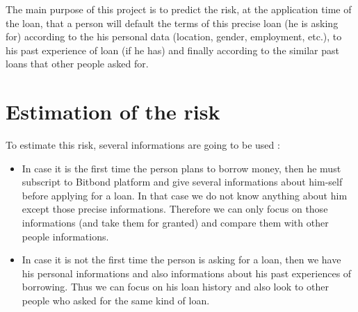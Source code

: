 The main purpose of this project is to predict the risk, at the application time of the loan, that a person will default the terms of this precise loan (he is asking for) according to the his personal data (location, gender, employment, etc.), to his past experience of loan (if he has) and finally according to the similar past loans that other people asked for.

\section{Estimation of the risk}
	To estimate this risk, several informations are going to be used :
	\begin{itemize}[label=$\bullet$]
	    \item In case it is the first time the person plans to borrow money, then he must subscript to Bitbond platform and give several informations about him-self before applying for a loan. In that case we do not know anything about him except those precise informations. Therefore we can only focus on those informations (and take them for granted) and compare them with other people informations.
	    \item In case it is not the first time the person is asking for a loan, then we have his personal informations and also informations about his past experiences of borrowing. Thus we can focus on his loan history and also look to other people who asked for the same kind of loan.
	\end{itemize}

